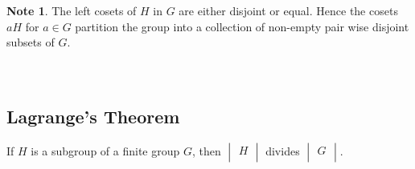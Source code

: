 \documentclass[11pt,a4paper]{article}
\theoremstyle{definition}
\newtheorem*{note}{Note}
\begin{document}
\begin{note}
The left cosets of $H$ in $G$ are either disjoint or equal. Hence the cosets $aH$ for $a\in G$ partition the group into a collection of non-empty pair wise disjoint subsets of $G$.\\\\\
\end{note}








\subsection{Lagrange's Theorem}
If $H$ is a subgroup of a finite group $G$, then $\begin{vmatrix}
H\\
\end{vmatrix}$ divides $\begin{vmatrix}
G\\
\end{vmatrix}$.\\
\end{document}
